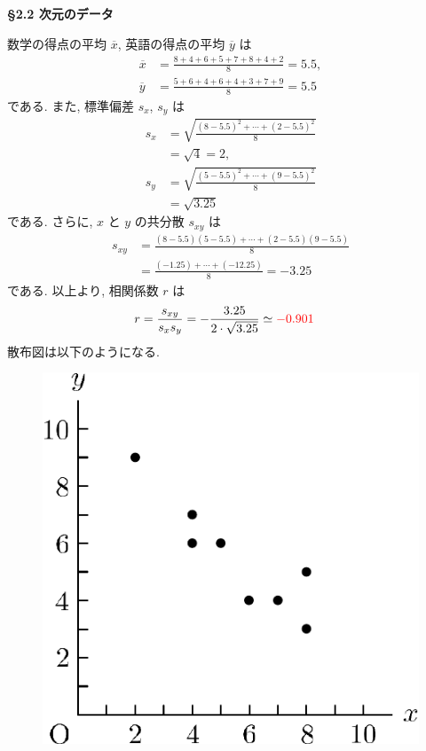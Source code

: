{\textbf{\S 2.2  次元のデータ}}
\basic
\begin{qenumerate}
	\item{
		数学の得点の平均 $\overline{x}$, 英語の得点の平均 $\overline{y}$ は
		\begin{align}
			\overline{x} &= \frac{8 + 4 + 6 + 5 + 7 + 8 + 4 + 2}{8} = 5.5, \\
			\overline{y} &= \frac{5 + 6 + 4 + 6 + 4 + 3 + 7 + 9}{8} = 5.5
		\end{align}
		である.
		また, 標準偏差 $s_{x}$, $s_{y}$ は
		\begin{align}
			s_{x} &= \sqrt{\frac{(8 - 5.5)^{2} + \cdots + (2 - 5.5)^{2}}{8}} \\
				&= \sqrt{4} = 2, \\
			s_{y} &= \sqrt{\frac{(5 - 5.5)^{2} + \cdots + (9 - 5.5)^{2}}{8}} \\
				&= \sqrt{3.25}
		\end{align}
		である.
		さらに, $x$ と $y$ の共分散 $s_{xy}$ は
		\begin{align}
			s_{xy} &= \frac{(8 - 5.5)(5 - 5.5) + \cdots + (2 - 5.5)(9 - 5.5)}{8} \\
				&= \frac{(-1.25) + \cdots + (-12.25)}{8} = -3.25
		\end{align}
		である.
		以上より, 相関係数 $r$ は
		\begin{align}
			r &= \frac{s_{xy}}{s_{x}s_{y}} = -\frac{3.25}{2\cdot \sqrt{3.25}} \simeq \textcolor{red}{-0.901}
		\end{align}
		散布図は以下のようになる.
		\begin{figure}[H]
			\centering
			\includegraphics[scale = 0.5]{./figure/90.pdf}

\end{figure}}
\end{qenumerate}
